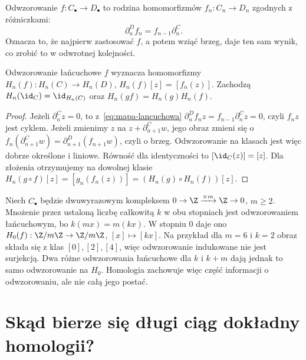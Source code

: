 \begin{definicja}
\label{def:mapa-lancuchowa}
Odwzorowanie $f:C_\bullet\to D_\bullet$ to rodzina
homomorfizmów $f_n:C_n\to D_n$ zgodnych
z różniczkami:
\begin{equation}\label{eq:mapa-lancuchowa}
 \partial^D_n f_n=f_{n-1}\partial^C_n.
\end{equation}
Oznacza to, że najpierw zastosować $f$,
a potem wziąć brzeg, daje ten sam wynik,
co zrobić to w odwrotnej kolejności.
\end{definicja}

\begin{stwierdzenie}
\label{prop:homologia-funktor}
Odwzorowanie łańcuchowe $f$ wyznacza homomorfizmy
$H_n(f):H_n(C)\to H_n(D)$,
$H_n(f)[z]=[f_n(z)]$. Zachodzą
$H_n(\id_C)=\id_{H_n(C)}$ oraz
$H_n(gf)=H_n(g)H_n(f)$.
\end{stwierdzenie}
\begin{proof}
Jeżeli $\partial^C_n z=0$, to z~\eqref{eq:mapa-lancuchowa}
$\partial^D_n f_nz=f_{n-1}\partial^C_nz=0$, czyli
$f_nz$ jest cyklem. Jeżeli zmienimy
$z$ na $z+\partial^C_{n+1}w$, jego obraz zmieni się o
$f_n(\partial^C_{n+1}w)=\partial^D_{n+1}(f_{n+1}w)$,
czyli o brzeg. Odwzorowanie na klasach jest więc
dobrze określone i liniowe.
Równość dla identyczności to $[\id_C(z)]=[z]$.
Dla złożenia otrzymujemy na dowolnej klasie
$H_n(g\circ f)[z]=[g_n(f_n(z))]
=(H_n(g)\circ H_n(f))[z]$.
\end{proof}

\begin{przyklad}
\label{prz:homologia-mapa-mod-m}
Niech $C_\bullet$ będzie dwuwyrazowym kompleksem
$0\to\Z\xrightarrow{\times m}\Z\to0$,
$m\geq2$. Mnożenie przez ustaloną liczbę
całkowitą $k$ w obu stopniach jest odwzorowaniem
łańcuchowym, bo $k(mx)=m(kx)$.
W stopniu $0$ daje ono
$H_0(f):\Z/m\Z\to\Z/m\Z$, $[x]\mapsto[kx]$.
Na przykład dla $m=6$ i $k=2$ obraz składa się
z klas $[0],[2],[4]$, więc odwzorowanie
indukowane nie jest surjekcją. Dwa różne
odwzorowania łańcuchowe dla $k$ i $k+m$
dają jednak to samo odwzorowanie na $H_0$.
Homologia zachowuje więc część informacji
o odwzorowaniu, ale nie całą jego postać.
\end{przyklad}

\section{Skąd bierze się długi ciąg dokładny homologii?}
\label{sec:dlugi-ciag-homologii}

